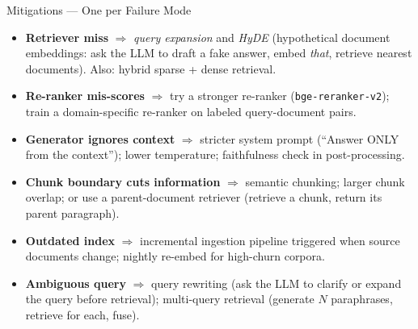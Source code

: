 \documentclass[10pt,english,aspectratio=169]{beamer}
\begin{document}
\begin{frame}{Mitigations --- One per Failure Mode}
\begin{itemize}
\item \textbf{Retriever miss} $\Rightarrow$ \emph{query expansion} and \emph{HyDE} (hypothetical document embeddings: ask the LLM to draft a fake answer, embed \emph{that}, retrieve nearest documents). Also: hybrid sparse + dense retrieval.

\medskip
\item \textbf{Re-ranker mis-scores} $\Rightarrow$ try a stronger re-ranker (\texttt{bge-reranker-v2}); train a domain-specific re-ranker on labeled query-document pairs.

\medskip
\item \textbf{Generator ignores context} $\Rightarrow$ stricter system prompt (``Answer ONLY from the context''); lower temperature; faithfulness check in post-processing.

\medskip
\item \textbf{Chunk boundary cuts information} $\Rightarrow$ semantic chunking; larger chunk overlap; or use a parent-document retriever (retrieve a chunk, return its parent paragraph).

\medskip
\item \textbf{Outdated index} $\Rightarrow$ incremental ingestion pipeline triggered when source documents change; nightly re-embed for high-churn corpora.

\medskip
\item \textbf{Ambiguous query} $\Rightarrow$ query rewriting (ask the LLM to clarify or expand the query before retrieval); multi-query retrieval (generate $N$ paraphrases, retrieve for each, fuse).
\end{itemize}
\end{frame}
\end{document}

